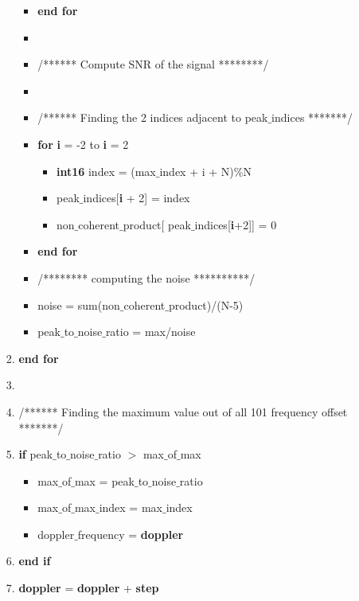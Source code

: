 \documentclass[journal,10pt,onecolumn]{article}
\begin{document}
\begin{itemize}
\begin{enumerate}
\begin{enumerate}
\begin{itemize}
            \item[] \textbf{end for} 
            \item[] 
            \item[] /****** Compute SNR of the signal ********/
            \item[] 
            \item[] /****** Finding the 2 indices adjacent to peak$\_$indices *******/
            \item[] \textbf{for} \textbf{i} = -2 to \textbf{i} = 2
            \begin{itemize}
                \item[] \textbf{int16} index = (max$\_$index + i + N)\%N
                \item[] peak$\_$indices[\textbf{i} + 2] = index
                \item[] non$\_$coherent$\_$product[ peak$\_$indices[\textbf{i}+2]] = 0
            \end{itemize}
            \item[] \textbf{end for}
            
            \item[] /******** computing the noise **********/
            \item[] noise = sum(non$\_$coherent$\_$product)/(N-5)
            
            \item[] peak$\_$to$\_$noise$\_$ratio = max/noise
            







        \end{itemize}
        \item[] \textbf{end for}
    \item[] 
    \item[] /****** Finding the maximum value out of all 101 frequency offset *******/
    \item[] \textbf{if}  peak$\_$to$\_$noise$\_$ratio $>$ max$\_$of$\_$max
    \begin{itemize}
        \item[] max$\_$of$\_$max = peak$\_$to$\_$noise$\_$ratio
        \item[] max$\_$of$\_$max$\_$index = max$\_$index
        \item[] doppler$\_$frequency = \textbf{doppler}
    \end{itemize}
    \item[] \textbf{end if}
    \item[] \textbf{doppler} = \textbf{doppler} + \textbf{step}


\end{enumerate}
\end{enumerate}
\end{itemize}
\end{document}
